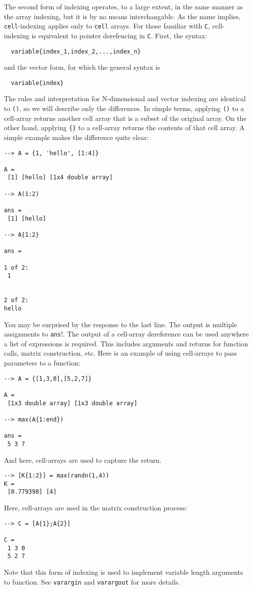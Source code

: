 The second form of indexing operates, to a large extent, in
the same manner as the array indexing, but it is by no means
interchangable.  As the name implies, \verb|cell|-indexing applies
only to \verb|cell| arrays.  For those familiar with \verb|C|, cell-
indexing is equivalent to pointer derefencing in \verb|C|.  First,
the syntax:
\begin{verbatim}
  variable{index_1,index_2,...,index_n}
\end{verbatim}
and the vector form, for which the general syntax is
\begin{verbatim}
  variable{index}
\end{verbatim}
The rules and interpretation for N-dimensional and vector indexing
are identical to \verb|()|, so we will describe only the differences.
In simple terms, applying \verb|()| to a cell-array returns another
cell array that is a subset of the original array.  On the other
hand, applying \verb|{}| to a cell-array returns the contents of that
cell array.  A simple example makes the difference quite clear:
\begin{verbatim}
--> A = {1, 'hello', [1:4]}

A = 
 [1] [hello] [1x4 double array] 

--> A(1:2)

ans = 
 [1] [hello] 

--> A{1:2}

ans = 

1 of 2:
 1 


2 of 2:
hello
\end{verbatim}
You may be surprised by the response to the last line.  The output
is multiple assignments to \verb|ans|!.  The output of a cell-array
dereference can be used anywhere a list of expressions is required.
This includes arguments and returns for function calls, matrix
construction, etc.  Here is an example of using cell-arrays to pass
parameters to a function:
\begin{verbatim}
--> A = {[1,3,0],[5,2,7]}

A = 
 [1x3 double array] [1x3 double array] 

--> max(A{1:end})

ans = 
 5 3 7 
\end{verbatim}
And here, cell-arrays are used to capture the return.
\begin{verbatim}
--> [K{1:2}] = max(randn(1,4))
K = 
 [0.779398] [4] 
\end{verbatim}
Here, cell-arrays are used in the matrix construction process:
\begin{verbatim}
--> C = [A{1};A{2}]

C = 
 1 3 0 
 5 2 7 
\end{verbatim}
Note that this form of indexing is used to implement variable
length arguments to function.  See \verb|varargin| and \verb|varargout|
for more details.
